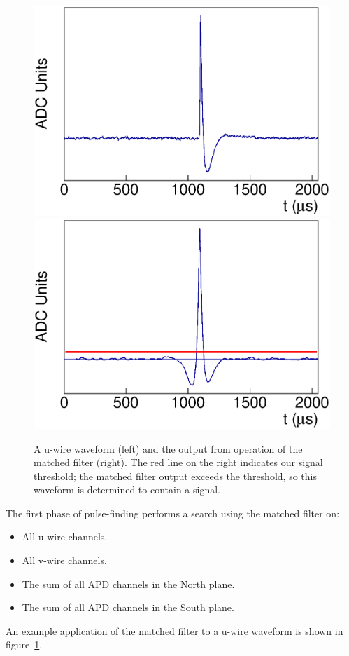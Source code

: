 \begin{figure}
\begin{center}
\includegraphics[keepaspectratio=true,width=.49\textwidth]{MFExamp_Raw.eps}
\includegraphics[keepaspectratio=true,width=.49\textwidth]{MFExamp_Applied.eps}
\end{center}
\renewcommand{\baselinestretch}{1}
\small\normalsize
\begin{quote}
\caption{A u-wire waveform (left) and the output from operation of the matched filter (right).  The red line on the right indicates our signal threshold; the matched filter output exceeds the threshold, so this waveform is determined to contain a signal.~\cite{ReconstructionDocument}}
\label{fig:MatchedFilterApplication}
\end{quote}
\end{figure}
\renewcommand{\baselinestretch}{2}
\small\normalsize

The first phase of pulse-finding performs a search using the matched filter on:
\begin{itemize}
\item All u-wire channels.
\item All v-wire channels.
\item The sum of all APD channels in the North plane.
\item The sum of all APD channels in the South plane.
\end{itemize}
An example application of the matched filter to a u-wire waveform is shown in figure~\ref{fig:MatchedFilterApplication}.

